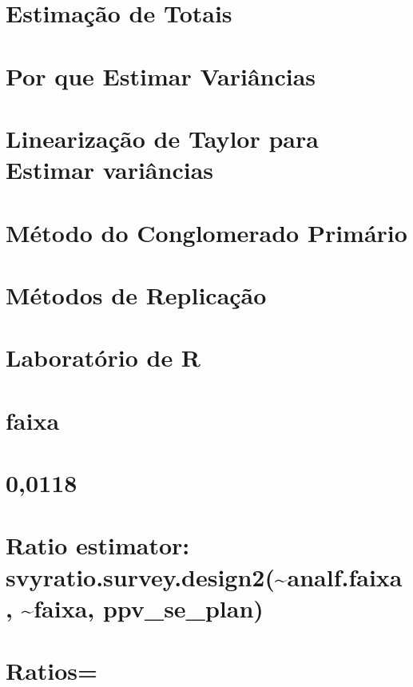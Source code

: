 \documentclass[]{book}
\theoremstyle{definition}
\theoremstyle{definition}
\theoremstyle{definition}
\theoremstyle{remark}
\begin{document}
\section{Estimação de Totais}\label{estimatotais}

\section{Por que Estimar Variâncias}\label{por-que-estimar-variancias}

\section{Linearização de Taylor para Estimar variâncias}\label{taylor}

\section{Método do Conglomerado
Primário}\label{metodo-do-conglomerado-primario}

\section{Métodos de Replicação}\label{metodos-de-replicacao}

\section{Laboratório de R}\label{laboratorio-de-r}

\section{faixa}\label{faixa}

\section{0,0118}\label{section}

\section{Ratio estimator:
svyratio.survey.design2(\textasciitilde{}analf.faixa,
\textasciitilde{}faixa,
ppv\_se\_plan)}\label{ratio-estimator-svyratio.survey.design2analf.faixa-faixa-ppv_se_plan}

\section{Ratios=}\label{ratios}
\end{document}
